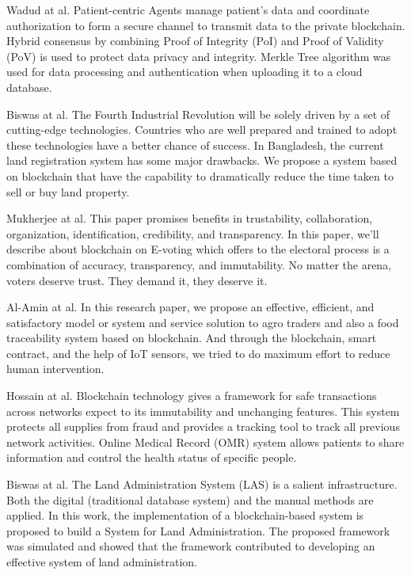 \documentclass[12pt]{ucthesis}
\begin{document}
Wadud at al.\cite{refAHW} Patient-centric Agents manage patient's data and coordinate authorization to form a secure channel to transmit data to the private blockchain. Hybrid consensus by combining Proof of Integrity (PoI) and Proof of Validity (PoV) is used to protect data privacy and integrity. Merkle Tree algorithm was used for data processing and authentication when uploading it to a cloud database.

Biswas at al. \cite{biswas2021landchain} The Fourth Industrial Revolution will be solely driven by a set of cutting-edge technologies. Countries who are well prepared and trained to adopt these technologies have a better chance of success. In Bangladesh, the current land registration system has some major drawbacks. We propose a system based on blockchain that have the capability to dramatically reduce the time taken to sell or buy land property.

Mukherjee at al. \cite{mukherjee2020hyper} This paper promises benefits in trustability, collaboration, organization, identification, credibility, and transparency. In this paper, we'll describe about blockchain on E-voting which offers to the electoral process is a combination of accuracy, transparency, and immutability. No matter the arena, voters deserve trust. They demand it, they deserve it.

Al-Amin at al.\cite{al2021towards} In this research paper, we propose an effective, efficient, and satisfactory model or system and service solution to agro traders and also a food traceability system based on blockchain. And through the blockchain, smart contract, and the help of IoT sensors, we tried to do maximum effort to reduce human intervention.

Hossain at al.\cite{9642537} Blockchain technology gives a framework for safe transactions across networks expect to its immutability and unchanging features. This system protects all supplies from fraud and provides a tracking tool to track all previous network activities. Online Medical Record (OMR) system allows patients to share information and control the health status of specific people.

Biswas at al.\cite{biswas2022drlas} The Land Administration System (LAS) is a salient infrastructure. Both the digital (traditional database system) and the manual methods are applied. In this work, the implementation of a blockchain-based system is proposed to build a System for Land Administration. The proposed framework was simulated and showed that the framework contributed to developing an effective system of land administration.
\end{document}
